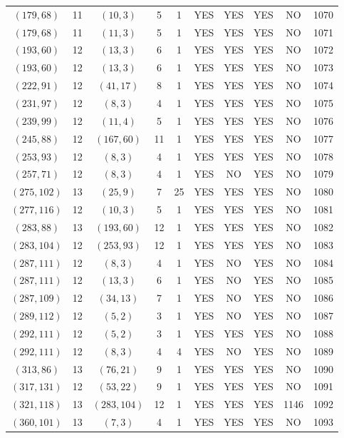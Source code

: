 \begin{longtable}{|c|c|c|c|c|c|c|c|c|c|}
$(179, 68)$ & 11 & $(10, 3)$ & 5 & 1 & YES & YES & YES & NO & 1070\\
$(179, 68)$ & 11 & $(11, 3)$ & 5 & 1 & YES & YES & YES & NO & 1071\\
$(193, 60)$ & 12 & $(13, 3)$ & 6 & 1 & YES & YES & YES & NO & 1072\\
$(193, 60)$ & 12 & $(13, 3)$ & 6 & 1 & YES & YES & YES & NO & 1073\\
$(222, 91)$ & 12 & $(41, 17)$ & 8 & 1 & YES & YES & YES & NO & 1074\\
$(231, 97)$ & 12 & $(8, 3)$ & 4 & 1 & YES & YES & YES & NO & 1075\\
$(239, 99)$ & 12 & $(11, 4)$ & 5 & 1 & YES & YES & YES & NO & 1076\\
$(245, 88)$ & 12 & $(167, 60)$ & 11 & 1 & YES & YES & YES & NO & 1077\\
$(253, 93)$ & 12 & $(8, 3)$ & 4 & 1 & YES & YES & YES & NO & 1078\\
$(257, 71)$ & 12 & $(8, 3)$ & 4 & 1 & YES & NO & YES & NO & 1079\\
$(275, 102)$ & 13 & $(25, 9)$ & 7 & 25 & YES & YES & YES & NO & 1080\\
$(277, 116)$ & 12 & $(10, 3)$ & 5 & 1 & YES & YES & YES & NO & 1081\\
$(283, 88)$ & 13 & $(193, 60)$ & 12 & 1 & YES & YES & YES & NO & 1082\\
$(283, 104)$ & 12 & $(253, 93)$ & 12 & 1 & YES & YES & YES & NO & 1083\\
$(287, 111)$ & 12 & $(8, 3)$ & 4 & 1 & YES & NO & YES & NO & 1084\\
$(287, 111)$ & 12 & $(13, 3)$ & 6 & 1 & YES & NO & YES & NO & 1085\\
$(287, 109)$ & 12 & $(34, 13)$ & 7 & 1 & YES & NO & YES & NO & 1086\\
$(289, 112)$ & 12 & $(5, 2)$ & 3 & 1 & YES & NO & YES & NO & 1087\\
$(292, 111)$ & 12 & $(5, 2)$ & 3 & 1 & YES & YES & YES & NO & 1088\\
$(292, 111)$ & 12 & $(8, 3)$ & 4 & 4 & YES & NO & YES & NO & 1089\\
$(313, 86)$ & 13 & $(76, 21)$ & 9 & 1 & YES & YES & YES & NO & 1090\\
$(317, 131)$ & 12 & $(53, 22)$ & 9 & 1 & YES & YES & YES & NO & 1091\\
$(321, 118)$ & 13 & $(283, 104)$ & 12 & 1 & YES & YES & YES & 1146 & 1092\\
$(360, 101)$ & 13 & $(7, 3)$ & 4 & 1 & YES & YES & YES & NO & 1093\\

\end{longtable}
